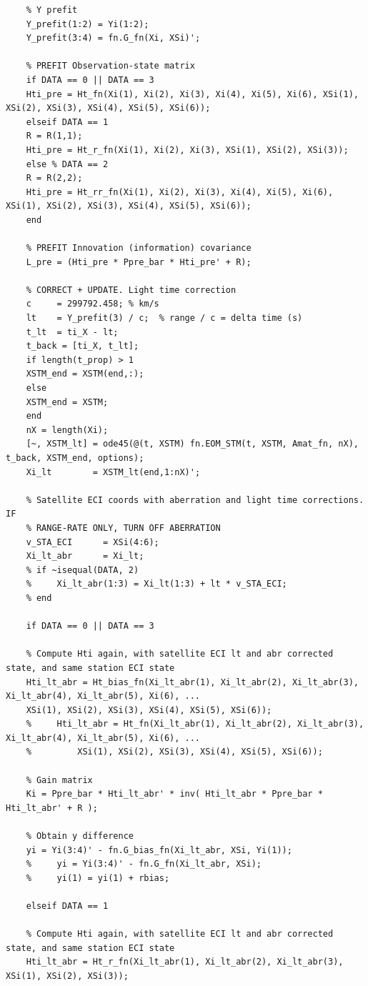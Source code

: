 \documentclass[conf]{new-aiaa}
\begin{document}
\begin{lstlisting}
	% Y prefit 
	Y_prefit(1:2) = Yi(1:2); 
	Y_prefit(3:4) = fn.G_fn(Xi, XSi)'; 
	
	% PREFIT Observation-state matrix 
	if DATA == 0 || DATA == 3
	Hti_pre = Ht_fn(Xi(1), Xi(2), Xi(3), Xi(4), Xi(5), Xi(6), XSi(1), XSi(2), XSi(3), XSi(4), XSi(5), XSi(6)); 
	elseif DATA == 1
	R = R(1,1); 
	Hti_pre = Ht_r_fn(Xi(1), Xi(2), Xi(3), XSi(1), XSi(2), XSi(3)); 
	else % DATA == 2
	R = R(2,2); 
	Hti_pre = Ht_rr_fn(Xi(1), Xi(2), Xi(3), Xi(4), Xi(5), Xi(6), XSi(1), XSi(2), XSi(3), XSi(4), XSi(5), XSi(6)); 
	end
	
	% PREFIT Innovation (information) covariance 
	L_pre = (Hti_pre * Ppre_bar * Hti_pre' + R); 
	
	% CORRECT + UPDATE. Light time correction 
	c     = 299792.458; % km/s 
	lt    = Y_prefit(3) / c;  % range / c = delta time (s) 
	t_lt  = ti_X - lt; 
	t_back = [ti_X, t_lt];  
	if length(t_prop) > 1 
	XSTM_end = XSTM(end,:); 
	else
	XSTM_end = XSTM; 
	end
	nX = length(Xi); 
	[~, XSTM_lt] = ode45(@(t, XSTM) fn.EOM_STM(t, XSTM, Amat_fn, nX), t_back, XSTM_end, options); 
	Xi_lt        = XSTM_lt(end,1:nX)'; 
	
	% Satellite ECI coords with aberration and light time corrections. IF
	% RANGE-RATE ONLY, TURN OFF ABERRATION 
	v_STA_ECI      = XSi(4:6); 
	Xi_lt_abr      = Xi_lt; 
	% if ~isequal(DATA, 2)
	%     Xi_lt_abr(1:3) = Xi_lt(1:3) + lt * v_STA_ECI; 
	% end 
	
	if DATA == 0 || DATA == 3
	
	% Compute Hti again, with satellite ECI lt and abr corrected state, and same station ECI state 
	Hti_lt_abr = Ht_bias_fn(Xi_lt_abr(1), Xi_lt_abr(2), Xi_lt_abr(3), Xi_lt_abr(4), Xi_lt_abr(5), Xi(6), ... 
	XSi(1), XSi(2), XSi(3), XSi(4), XSi(5), XSi(6)); 
	%     Hti_lt_abr = Ht_fn(Xi_lt_abr(1), Xi_lt_abr(2), Xi_lt_abr(3), Xi_lt_abr(4), Xi_lt_abr(5), Xi(6), ... 
	%         XSi(1), XSi(2), XSi(3), XSi(4), XSi(5), XSi(6)); 
	
	% Gain matrix 
	Ki = Ppre_bar * Hti_lt_abr' * inv( Hti_lt_abr * Ppre_bar * Hti_lt_abr' + R ); 
	
	% Obtain y difference 
	yi = Yi(3:4)' - fn.G_bias_fn(Xi_lt_abr, XSi, Yi(1)); 
	%     yi = Yi(3:4)' - fn.G_fn(Xi_lt_abr, XSi); 
	%     yi(1) = yi(1) + rbias; 
	
	elseif DATA == 1
	
	% Compute Hti again, with satellite ECI lt and abr corrected state, and same station ECI state 
	Hti_lt_abr = Ht_r_fn(Xi_lt_abr(1), Xi_lt_abr(2), Xi_lt_abr(3), XSi(1), XSi(2), XSi(3)); 
	

\end{lstlisting}
\end{document}
